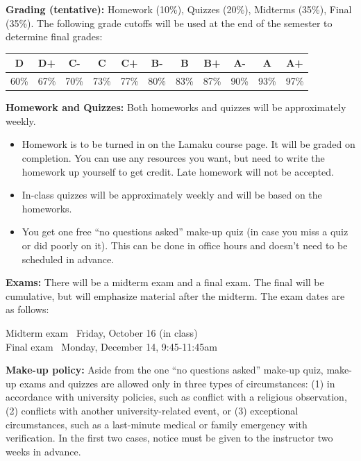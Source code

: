 \documentclass[10pt]{article}
\newcommand{\vt}{\vskip 5mm} %
\newcommand{\Fl}{\vt\noindent\textbf} %
\begin{document}
\Fl{Grading (tentative):} Homework (10\%), Quizzes (20\%), Midterms (35\%),
Final (35\%). The following grade cutoffs will be used at the end of the
semester to determine final grades:
\begin{center}
  \begin{tabular}{|c|c|c|c|c|c|c|c|c|c|c|}
    \hline
    D&D+&C-&C&C+&B-&B&B+&A-&A&A+  \\
    \hline
    60\%&67\%&70\%&73\%&77\%&80\%&83\%&87\%&90\%&93\%&97\%\\
    \hline
  \end{tabular}
\end{center}
\vspace{-.5em}

\Fl{Homework and Quizzes:} Both homeworks and quizzes will be approximately
weekly.
\begin{itemize}
  \item Homework is to be turned in on the Lamaku course page. It will be
  graded on completion. You can use any resources you want, but need to write
  the homework up yourself to get credit. Late homework will not be accepted.
  \item In-class quizzes will be approximately weekly and will be based on the
  homeworks.
  \item You get one free ``no questions asked'' make-up quiz (in case you miss
  a quiz or did poorly on it). This can be done in office hours and doesn't
  need to be scheduled in advance.
\end{itemize}
\vspace{-.5em}


\Fl{Exams:} There will be a midterm exam and a final exam. The final will be
cumulative, but will emphasize material after the midterm. The exam dates are
as follows:
\begin{center} \begin{minipage}{5.0in}
    \begin{flushleft}
      Midterm exam  \dotfill~Friday, October 16 (in class) \\
      Final exam     \dotfill~Monday, December 14, 9:45-11:45am\\
    \end{flushleft}
  \end{minipage}
\end{center}

\Fl{Make-up policy:} Aside from the one ``no questions asked'' make-up quiz,
make-up exams and quizzes are allowed only in three types of circumstances:
(1) in accordance with university policies, such as conflict with a religious
observation, (2) conflicts with another university-related event, or (3)
exceptional circumstances, such as a last-minute medical or family emergency
with verification. In the first two cases, notice must be given to the
instructor two weeks in advance.
\end{document}
